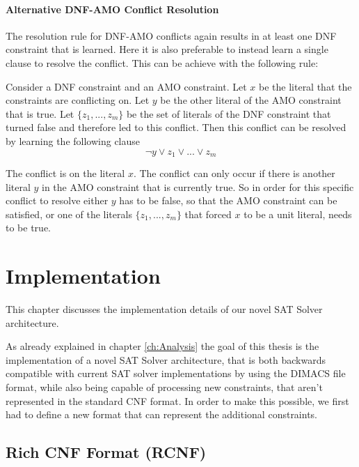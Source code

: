 \subsubsection{Alternative DNF-AMO Conflict Resolution}

The resolution rule for DNF-AMO conflicts again results in at least one DNF constraint that is learned. Here it is also preferable to instead learn a single clause to resolve the conflict. This can be achieve with the following rule:


\begin{leftbar}
Consider a DNF constraint and an AMO constraint. Let $x$ be the literal that the constraints are conflicting on. Let $y$ be the other literal of the AMO constraint that is true. Let $\{z_1,...,z_m\}$ be the set of literals of the DNF constraint that turned false and therefore led to this conflict. Then this conflict can be resolved by learning the following clause
\begin{displaymath}
\neg y \vee z_1 \vee ... \vee z_m
\end{displaymath}
\end{leftbar}

The conflict is on the literal $x$. The conflict can only occur if there is another literal $y$ in the AMO constraint that is currently true. So in order for this specific conflict to resolve either $y$ has to be false, so that the AMO constraint can be satisfied, or one of the literals $\{z_1,...,z_m\}$ that forced $x$ to be a unit literal, needs to be true.

\chapter{Implementation}
\label{ch:Implementation}

This chapter discusses the implementation details of our novel SAT Solver architecture.

As already explained in chapter \ref{ch:Analysis} the goal of this thesis is the implementation of a novel SAT Solver architecture, that is both backwards compatible with current SAT solver implementations by using the DIMACS file format, while also being capable of processing new constraints, that aren't represented in the standard CNF format. In order to make this possible, we first had to define a new format that can represent the additional constraints.

\section{Rich CNF Format (RCNF)}

